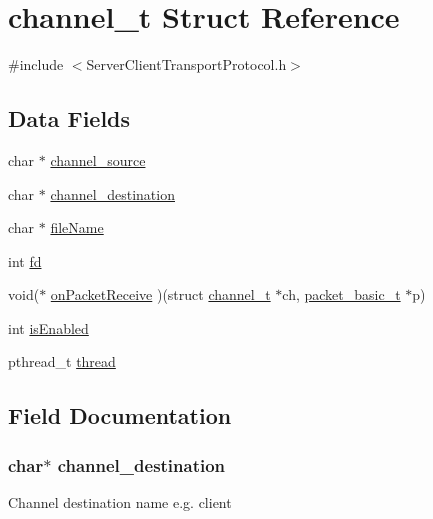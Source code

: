 \hypertarget{structchannel__t}{}\section{channel\+\_\+t Struct Reference}
\label{structchannel__t}


{\ttfamily \#include $<$Server\+Client\+Transport\+Protocol.\+h$>$}

\subsection*{Data Fields}
\begin{DoxyCompactItemize}
\item 
char $\ast$ \hyperlink{structchannel__t_a0a72aa1c901810c34da12df46f40041e}{channel\+\_\+source}
\item 
char $\ast$ \hyperlink{structchannel__t_a459138b7f05f5d080fa284cea148e1ea}{channel\+\_\+destination}
\item 
char $\ast$ \hyperlink{structchannel__t_a25c8761bc1f523fe6a53db546ae83add}{file\+Name}
\item 
int \hyperlink{structchannel__t_a6f8059414f0228f0256115e024eeed4b}{fd}
\item 
void($\ast$ \hyperlink{structchannel__t_ae391524520adf65e91f52efaffb033a5}{on\+Packet\+Receive} )(struct \hyperlink{structchannel__t}{channel\+\_\+t} $\ast$ch, \hyperlink{structpacket__basic__t}{packet\+\_\+basic\+\_\+t} $\ast$p)
\item 
int \hyperlink{structchannel__t_a5c56d01677044a9e8009acf457aa1a37}{is\+Enabled}
\item 
pthread\+\_\+t \hyperlink{structchannel__t_a01f75a9ad916f63a94e06a27635ba278}{thread}
\end{DoxyCompactItemize}


\subsection{Field Documentation}
\subsubsection[{\texorpdfstring{channel\+\_\+destination}{channel_destination}}]{\setlength{\rightskip}{0pt plus 5cm}char$\ast$ channel\+\_\+destination}\hypertarget{structchannel__t_a459138b7f05f5d080fa284cea148e1ea}{}\label{structchannel__t_a459138b7f05f5d080fa284cea148e1ea}
Channel destination name e.\+g. client 


